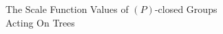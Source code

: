\documentclass[preview]{standalone}
\begin{document}
\begin{center}
The Scale Function Values of $(P)$-closed Groups \\Acting On Trees
\end{center}
\end{document}
